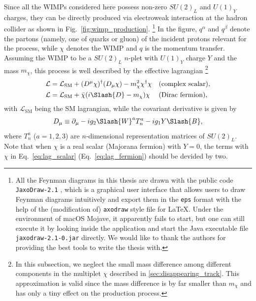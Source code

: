 \documentclass[12pt,twoside,book]{article}
\begin{document}
Since all the WIMPs considered here possess non-zero $SU(2)_L$ and $U(1)_Y$ charges, they can be directly produced via electroweak interaction at the hadron collider as shown in Fig.~\ref{fig:wimp_production}.
\footnote{
  All the Feynman diagrams in this thesis are drawn with the public code \texttt{JaxoDraw-2.1} \cite{BINOSI20091709}, which is a graphical user interface that allows users to draw Feynman diagrams intuitively and export them in the \texttt{eps} format with the help of the (modification of) \texttt{axodraw} style file for \LaTeX \cite{VERMASEREN199445}.
  Under the environment of macOS Mojave, it apparently fails to start, but one can still execute it by looking inside the application and start the Java executable file \texttt{jaxodraw-2.1-0.jar} directly.
  We would like to thank the authors for providing the best tools to write the thesis with.
}
In the figure, $q^\alpha$ and $q^\beta$ denote the partons (namely, one of quarks or gluon) of the incident protons relevant for the process, while $\chi$ denotes the WIMP and $q$ is the momentum transfer.
Assuming the WIMP to be a $SU(2)_L$ $n$-plet with $U(1)_Y$ charge $Y$ and the mass $m_\chi$, this process is well described by the effective lagrangian
\footnote{
  In this subsection, we neglect the small mass difference among different components in the multiplet $\chi$ described in \ref{sec:disappearing_track}.
  This approximation is valid since the mass difference is by far smaller than $m_\chi$ and has only a tiny effect on the production process.
}
\begin{align}
  \mathcal{L} &= \mathcal{L}_{\mathrm{SM}} + (D^\mu \chi)^\dagger (D_\mu \chi) - m_\chi^2 \chi^\dagger \chi &
  &\text{(complex scalar)}, \label{eq:lag_scalar}\\
  \mathcal{L} &= \mathcal{L}_{\mathrm{SM}} + \bar{\chi} (i \Slash{D} - m_\chi) \chi &
  &\text{(Dirac fermion)}, \label{eq:lag_fermion}
\end{align}
with $\mathcal{L}_{\mathrm{SM}}$ being the SM lagrangian, while the covariant derivative is given by
\begin{align}
  D_\mu \equiv \partial_\mu - i g_2 \Slash{W}^a T_n^a - i g_1 Y \Slash{B},
\end{align}
where $T_n^a$ ($a=1,2,3$) are $n$-dimensional representation matrices of $SU(2)_L$.
Note that when $\chi$ is a real scalar (Majorana fermion) with $Y=0$, the terms with $\chi$ in Eq.~\eqref{eq:lag_scalar} (Eq.~\eqref{eq:lag_fermion}) should be devided by two.
\end{document}

